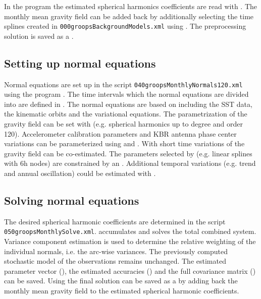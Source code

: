 In the program  the estimated spherical harmonics
coefficients are read with
.
The monthly mean gravity field can be added back by additionally selecting the time splines created
in \verb|000groopsBackgroundModels.xml| using
. The preprocessing solution
is saved as a .

\subsection{Setting up normal equations}\label{cookbook.gravityFieldGrace:monthlyNormals}
Normal equations are set up in the script \verb|040groopsMonthlyNormals120.xml| using
the program . The time intervals which the normal
equations are divided into are defined in .
The normal equations are based on  including the SST data,
the kinematic orbits and the variational equations. The parametrization of the gravity field can
be set with 
(e.g. spherical harmonics up to degree and order 120). Accelerometer calibration parameters
and KBR antenna phase center variations can be parameterized using
 and
.
With  short time variations of the gravity
field can be co-estimated. The parameters selected by
 (e.g. linear splines with 6h nodes) are
constrained by an .
Additional temporal variations (e.g. trend and annual oscillation) could be estimated with
.

\subsection{Solving normal equations}\label{cookbook.gravityFieldGrace:monhtlySolve}
The desired spherical harmonic coefficients are determined in the script \verb|050groopsMonthlySolve.xml|.
 accumulates  and solves
the total combined system. Variance component estimation is used to determine the relative weighting
of the individual normals, i.e. the arc-wise variances. The previously computed stochastic model of
the observations remains unchanged. The estimated parameter vector (),
the estimated accuracies () and the full covariance matrix
() can be saved.
Using  the final solution can be saved as
a  by adding back the monthly mean gravity
field to the estimated spherical harmonic coefficients.

